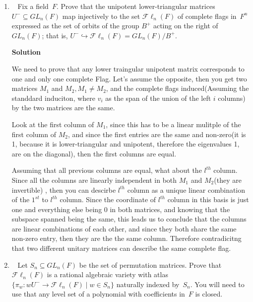 \documentclass[11pt]{article}
\newcommand\red[1]{\marginpar{\linespread{.85}\sf%
		   \vspace{-1.4ex}\footnotesize{\color{red}#1}}}
\newcommand\score[1]{\marginpar{\vspace{-2ex}\color{blue}{#1/3}}\hspace{-1ex}}
\newcommand\0{\mathbf{0}}
\newcommand\GL{\mathit{GL}}
\newcommand\FL{{\mathcal F}{\ell}_n}
\newcommand\into{\hookrightarrow}
\newcommand\<{\langle}
\renewcommand\>{\rangle}
\begin{document}
\begin{enumerate}
The transition functions are $\pi_{1} \circ \pi_{2}^{-1}$ 
and $\pi_{2} \circ \pi_{1}^{-1}$, This functions are differeniable, so it is 
a smooth manifold. I don't know what a rational algebraic variety is, but since the 
transition functions are rational I suppose it is a rational algebraic variety.

\item\ \score{3}%
Fix a field~$F$.  Prove that the unipotent lower-triangular matrices
$U^- \subseteq \GL_n(F)$ map injectively to the set $\FL(F)$ of
complete flags in~$F^n$ expressed as the set of orbits of the group
$B^+$ acting on the right of~$\GL_n(F)$; that is, $U^- \into \FL(F) =
\GL_n(F)/B^+$.

\textbf{Solution}

We need to prove that any lower traingular unipotent matrix corresponds
to one and only one complete Flag. Let's assume the opposite, then you get
two matrices $M_{1}$ and $M_{2}, M_{1}\neq M_{2}$, and the complete flags
induced(Assuming the standdard induciton, where $v_i$ as the span of the union 
of the left $i$ columns) by the two matrices are the same.

Look at the first column of $M_{1}$, since this has to be a linear mulitple
of the first column of $M_{2}$, and since the first entries are the same 
and non-zero(it is 1, because it is lower-triangular and unipotent, therefore
the eigenvalues 1, are on the diagonal), then the first columns are equal.

Assuming that all previous columns are equal, what about the $l^{th}$ column.
Since all the columns are linearly independent in both $M_1$ and $M_2$(they are invertible)
, then you can descirbe $l^{th}$ column as a unique linear combination of the 
$1^{st}$ to $l^{th}$ column. Since the coordinate of $l^{th}$ column in this basis is just one and everything
else being 0 in both matrices, and knowing that the subspace spanned being 
the same, this leads us to conclude that the columns are linear combinations
of each other, and since they both share the same non-zero entry, then they are the 
the same column. Therefore contradicitng that two different unitary matrices
can describe the same complete flag.

\item\ \score{1}%
Let $S_n \subseteq \GL_n(F)$ be the set of permutation matrices.
Prove that $\FL(F)$ is a rational algebraic variety with atlas
$\{\pi_w: wU^- \to \FL(F) \mid w \in S_n\}$ naturally indexed
by~$S_n$.  You will need to use that any level set
of a polynomial with coefficients in~$F$ is closed. \red{Your strategy is quite unclear.}


\end{enumerate}
\end{document}

